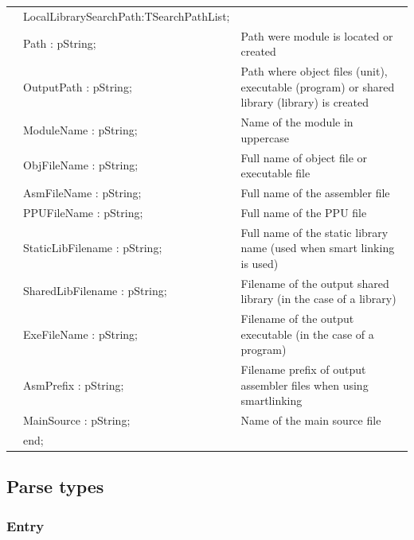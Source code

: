 \documentclass [a4paper,12pt]{article}
\begin{document}
\begin{longtable}{|l@{\extracolsep{\fill}}lp{7cm}|}
&\textsf{LocalLibrarySearchPath:TSearchPathList;}&  \\
&\textsf{Path : pString;}& Path were module is located or created \\
&\textsf{OutputPath : pString;}& Path where object files (unit), executable (program) or shared library (library) is created \\
&\textsf{ModuleName : pString;}& Name of the module in uppercase \\
&\textsf{ObjFileName : pString;}& Full name of object file or executable file \\
&\textsf{AsmFileName : pString;}& Full name of the assembler file \\
&\textsf{PPUFileName : pString;}& Full name of the PPU file \\
&\textsf{StaticLibFilename : pString;}& Full name of the static library name (used when smart linking is used) \\
&\textsf{SharedLibFilename : pString;}& Filename of the output shared library (in the case of a library) \\
&\textsf{ExeFileName : pString;}& Filename of the output executable (in the case of a program) \\
&\textsf{AsmPrefix : pString;}& Filename prefix of output assembler files when using smartlinking \\
&\textsf{MainSource : pString;}& Name of the main source file \\
&\textsf{end;}& \\
\end{longtable}

\subsection{Parse types}
\label{subsec:parse}

\subsubsection{Entry}
\label{subsubsec:entry}
\end{document}

